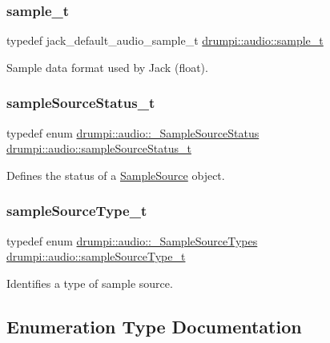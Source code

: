 \subsubsection{\texorpdfstring{sample\+\_\+t}{sample\_t}}
{\footnotesize\ttfamily typedef jack\+\_\+default\+\_\+audio\+\_\+sample\+\_\+t \hyperlink{namespacedrumpi_1_1audio_aca0bdc9164f87b72057e284442abab6e}{drumpi\+::audio\+::sample\+\_\+t}}

Sample data format used by Jack ({\ttfamily float}). \mbox{\label{namespacedrumpi_1_1audio_a51bdf5757f414341f104d45e75e2bf63}} 
\subsubsection{\texorpdfstring{sample\+Source\+Status\+\_\+t}{sampleSourceStatus\_t}}
{\footnotesize\ttfamily typedef enum \hyperlink{namespacedrumpi_1_1audio_a015d8de4ce400e4c660b0a0173c98234}{drumpi\+::audio\+::\+\_\+\+Sample\+Source\+Status}  \hyperlink{namespacedrumpi_1_1audio_a51bdf5757f414341f104d45e75e2bf63}{drumpi\+::audio\+::sample\+Source\+Status\+\_\+t}}

Defines the status of a \hyperlink{classdrumpi_1_1audio_1_1SampleSource}{Sample\+Source} object. \mbox{\label{namespacedrumpi_1_1audio_a997f55e8a5b5348cf74dbedb7abe8a59}} 
\subsubsection{\texorpdfstring{sample\+Source\+Type\+\_\+t}{sampleSourceType\_t}}
{\footnotesize\ttfamily typedef enum \hyperlink{namespacedrumpi_1_1audio_a64dba7645afe63b0d4a44ef3daa16a8b}{drumpi\+::audio\+::\+\_\+\+Sample\+Source\+Types}  \hyperlink{namespacedrumpi_1_1audio_a997f55e8a5b5348cf74dbedb7abe8a59}{drumpi\+::audio\+::sample\+Source\+Type\+\_\+t}}

Identifies a type of sample source. 

\subsection{Enumeration Type Documentation}
\mbox{\label{namespacedrumpi_1_1audio_af36111ce9632c39e5acb2c811f228e2f}} 
